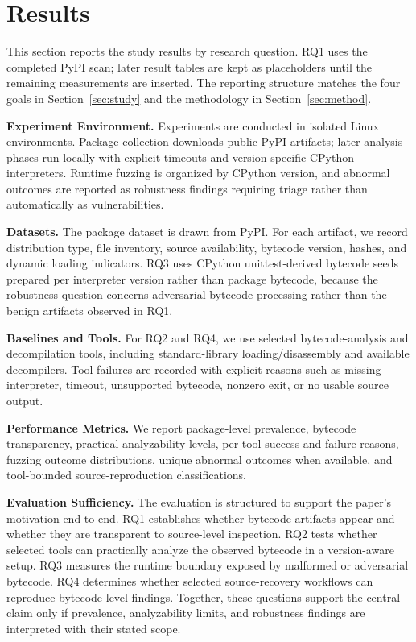 
\section{Results}\label{sec:results}

This section reports the study results by research question.  RQ1 uses the completed PyPI scan; later result tables are kept as placeholders until the remaining measurements are inserted.  The reporting structure matches the four goals in Section~\ref{sec:study} and the methodology in Section~\ref{sec:method}.

\noindent
{\bf Experiment Environment.}
Experiments are conducted in isolated Linux environments.  Package collection downloads public PyPI artifacts; later analysis phases run locally with explicit timeouts and version-specific CPython interpreters.  Runtime fuzzing is organized by CPython version, and abnormal outcomes are reported as robustness findings requiring triage rather than automatically as vulnerabilities.

\noindent
{\bf Datasets.}
The package dataset is drawn from PyPI.  For each artifact, we record distribution type, file inventory, source availability, bytecode version, hashes, and dynamic loading indicators.  RQ3 uses CPython unittest-derived bytecode seeds prepared per interpreter version rather than package bytecode, because the robustness question concerns adversarial bytecode processing rather than the benign artifacts observed in RQ1.

\noindent
{\bf Baselines and Tools.}
For RQ2 and RQ4, we use selected bytecode-analysis and decompilation tools, including standard-library loading/disassembly and available decompilers.  Tool failures are recorded with explicit reasons such as missing interpreter, timeout, unsupported bytecode, nonzero exit, or no usable source output.

\noindent
\textbf{Performance Metrics.}
We report package-level prevalence, bytecode transparency, practical analyzability levels, per-tool success and failure reasons, fuzzing outcome distributions, unique abnormal outcomes when available, and tool-bounded source-reproduction classifications.

\noindent
\textbf{Evaluation Sufficiency.}
The evaluation is structured to support the paper's motivation end to end.  RQ1 establishes whether bytecode artifacts appear and whether they are transparent to source-level inspection.  RQ2 tests whether selected tools can practically analyze the observed bytecode in a version-aware setup.  RQ3 measures the runtime boundary exposed by malformed or adversarial bytecode.  RQ4 determines whether selected source-recovery workflows can reproduce bytecode-level findings.  Together, these questions support the central claim only if prevalence, analyzability limits, and robustness findings are interpreted with their stated scope.

